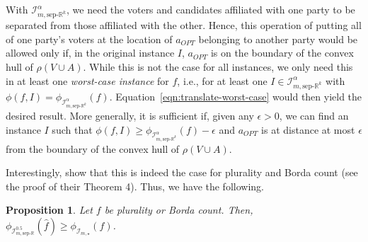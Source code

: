 \documentclass[letterpaper]{article} %
\newcommand{\citet}[1]{\citeauthor{#1}~\shortcite{#1}}
\newtheorem{theorem}{Theorem}
\newtheorem{proposition}[theorem]{Proposition}
\theoremstyle{definition}
\newtheorem{definition}{Definition}
\renewcommand{\hat}{\widehat}
\DeclareMathOperator*{\argmin}{\arg\,\min}
\newcommand{\bbR}{\mathbb{R}}
\newcommand{\calI}{\mathcal{I}}
\newcommand{\all}{\star}
\newcommand{\sep}{\textrm{sep-}}
\newcommand{\euc}[1]{\bbR^{#1}}
\newcommand{\eucsep}[1]{\sep\euc{#1}}
\newcommand{\eucline}{\bbR}
\newcommand{\euclinesep}{\sep\eucline}
\newcommand{\I}{\calI}
\begin{document}
With $\I^{\alpha}_{m,\eucsep{k}}$, we need the voters and candidates affiliated with one party to be separated from those affiliated with the other. Hence, this operation of putting all of one party's voters at the location of $a_{OPT}$ belonging to another party would be allowed only if, in the original instance $I$, $a_{OPT}$ is on the boundary of the convex hull of $\rho(V \cup A)$. While this is not the case for all instances, we only need this in at least one \emph{worst-case instance} for $f$, i.e., for at least one $I \in \I^{\alpha}_{m,\eucsep{k}}$ with $\phi(f,I) = \phi_{\I^{\alpha}_{m,\eucsep{k}}}(f)$. Equation~\eqref{eqn:translate-worst-case} would then yield the desired result. More generally, it is sufficient if, given any $\epsilon > 0$, we can find an instance $I$ such that $\phi(f,I) \ge \phi_{\I^{\alpha}_{m,\eucsep{k}}}(f) - \epsilon$ and $a_{OPT}$ is at distance at most $\epsilon$ from the boundary of the convex hull of $\rho(V \cup A)$.


Interestingly, \cite{ABP15} show that this is indeed the case for plurality and Borda count (see the proof of their Theorem 4). Thus, we have the following.

\begin{proposition}
	Let $f$ be plurality or Borda count. Then, $\phi_{\I^{0.5}_{m,\euclinesep}}(\hat{f}) \ge \phi_{\I_{m,\all}}(f)$.
\label{prop:plu-borda}
\end{proposition}

%
%
%
%
%
\end{document}
